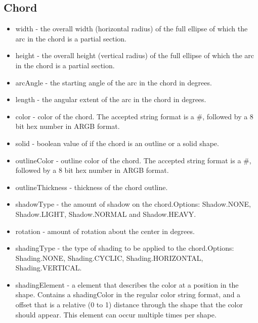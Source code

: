 \documentclass{article}
\begin{document}
\subsection{Chord}
\begin{itemize}
\item width - the overall width (horizontal radius) of the full ellipse of which the arc in the chord is a partial section. 
\item height - the overall height (vertical radius) of the full ellipse of which the arc in the chord is a partial section.
\item arcAngle - the starting angle of the arc in the chord in degrees.
\item length - the angular extent of the arc in the chord in degrees.
\item color - color of the chord. The accepted string format is a \#, followed by a 8 bit hex number in ARGB format.
\item solid - boolean value of if the chord is an outline or a solid shape.
\item outlineColor - outline color of the chord. The accepted string format is a \#, followed by a 8 bit hex number in ARGB format.
\item outlineThickness - thickness of the chord outline.
\item shadowType - the amount of shadow on the chord.\newline  Options: Shadow.NONE, Shadow.LIGHT, Shadow.NORMAL and Shadow.HEAVY.
\item rotation - amount of rotation about the center in degrees. 
\item shadingType - the type of shading to be applied to the chord.\newline  Options: Shading.NONE, Shading.CYCLIC, Shading.HORIZONTAL, Shading.VERTICAL.
\item shadingElement - a element that describes the color at a position in the shape. Contains a shadingColor in the regular color string format, and a offset that is a relative (0 to 1) distance through the shape that the color should appear. This element can occur multiple times per shape.
\end{itemize}
\end{document}
